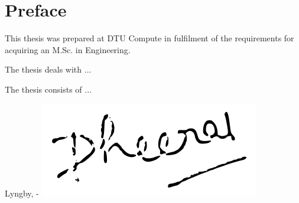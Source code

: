 \chapter{Preface}

This thesis was prepared at DTU Compute in fulfilment of the requirements for acquiring an M.Sc. in Engineering.

The thesis deals with ...

The thesis consists of ...
\vspace{20mm}
\begin{center}
    \hspace{20mm} Lyngby, \thesishandin-\thesisyear
    \vspace{5mm}
    \newline
    \includegraphics[scale=0.5]{figures/Signature}
\end{center}
\begin{flushright}
    \thesisauthor
\end{flushright}
